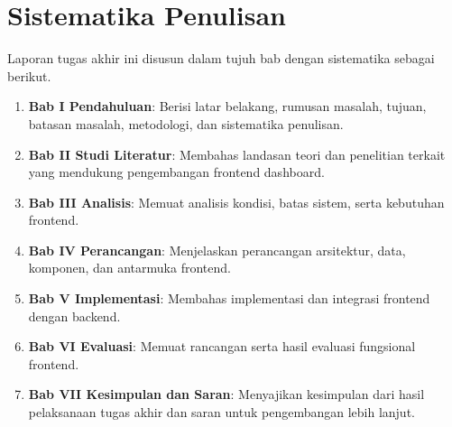 \section{Sistematika Penulisan}
Laporan tugas akhir ini disusun dalam tujuh bab dengan sistematika sebagai
berikut.
\begin{enumerate}
    \item \textbf{Bab I Pendahuluan}: Berisi latar belakang, rumusan masalah,
    tujuan, batasan masalah, metodologi, dan sistematika penulisan.
    \item \textbf{Bab II Studi Literatur}: Membahas landasan teori dan
    penelitian terkait yang mendukung pengembangan frontend dashboard.
    \item \textbf{Bab III Analisis}: Memuat analisis kondisi, batas sistem,
    serta kebutuhan frontend.
    \item \textbf{Bab IV Perancangan}: Menjelaskan perancangan arsitektur,
    data, komponen, dan antarmuka frontend.
    \item \textbf{Bab V Implementasi}: Membahas implementasi dan integrasi
    frontend dengan backend.
    \item \textbf{Bab VI Evaluasi}: Memuat rancangan serta hasil evaluasi
    fungsional frontend.
    \item \textbf{Bab VII Kesimpulan dan Saran}: Menyajikan kesimpulan dari
    hasil pelaksanaan tugas akhir dan saran untuk pengembangan lebih lanjut.
\end{enumerate}